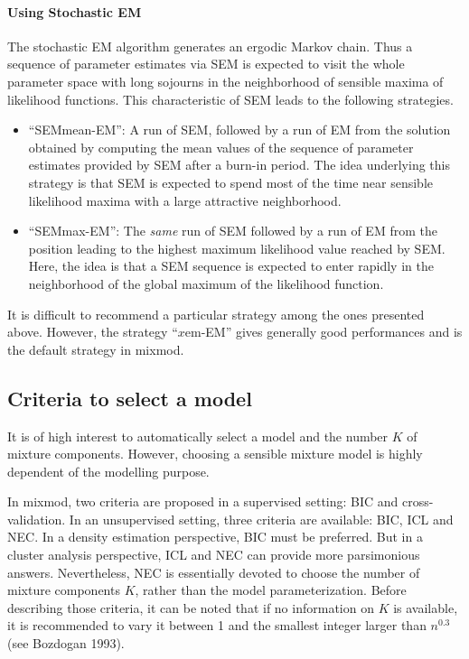 \documentclass[12pt]{article}
\begin{document}
\paragraph{Using Stochastic EM}
The stochastic EM algorithm generates an ergodic Markov chain.  Thus a sequence of parameter
estimates via SEM is expected to visit the whole parameter space with long sojourns in the
neighborhood of sensible maxima of likelihood functions. This characteristic of SEM leads to
the following strategies.
\begin{itemize}
\item ``SEMmean-EM'': A run of SEM, followed by a run of EM from the solution obtained by
  computing the mean values of the sequence of parameter estimates provided by SEM after a
  burn-in period.  The idea underlying this strategy is that SEM is expected to spend most of
  the time near sensible likelihood maxima with a large attractive neighborhood.
\item ``SEMmax-EM'': The {\em same} run of SEM followed by a run of EM from the position
  leading to the highest maximum likelihood value reached by SEM.  Here, the idea is that a SEM
  sequence is expected to enter rapidly in the neighborhood of the global maximum of the
  likelihood function.
\end{itemize}
It is difficult to recommend a particular strategy among the ones presented above.  However,
the strategy ``$x$em-EM'' gives generally good performances and is the default strategy in {\sc
  mixmod}.

\subsection{Criteria to select a model}
It is of high interest to automatically select a model and the number $K$ of mixture
components.  However, choosing a sensible mixture model is highly dependent of the modelling
purpose.

In {\sc mixmod}, two criteria are proposed in a supervised setting: BIC and cross-validation.
In an unsupervised setting, three criteria are available: BIC, ICL and NEC. In a density
estimation perspective, BIC must be preferred. But in a cluster analysis perspective, ICL and
NEC can provide more parsimonious answers. Nevertheless, NEC is essentially devoted to choose
the number of mixture components $K$, rather than the model parameterization. Before describing
those criteria, it can be noted that if no information on $K$ is available, it is recommended
to vary it between 1 and the smallest integer larger than $n^{0.3}$ (see Bozdogan 1993).
\end{document}
